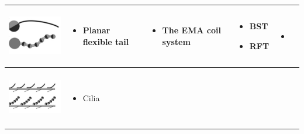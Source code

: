 \documentclass[12pt,a4paper,titlepage]{report}
\begin{document}
\begin{table}[h!]
\begin{tabular}{ c m{2.5cm}  m{4.3cm} m{3cm} m{2cm}}
\begin{minipage}{.3\textwidth}
      \includegraphics[width=\linewidth, height=25mm]{Planar_flexible_tail}
    \end{minipage}
    &
    \begin{minipage}[t]{3cm}
      \begin{itemize}
        \item Planar flexible tail
     
      \end{itemize}
    \end{minipage}
    & 
    \begin{minipage}[t]{4cm}
      \begin{itemize}
        \item The EMA coil system
     
      \end{itemize}
    \end{minipage}
 &
  \begin{minipage}[t]{3cm}
      \begin{itemize}
        \item BST
	\item RFT
     
      \end{itemize}
    \end{minipage}

	&
	   \begin{itemize}
        \item \citep{kim2013fabrication}
   
      \end{itemize}
    \\ \hline


\begin{minipage}{.3\textwidth}
      \includegraphics[width=\linewidth, height=25mm]{cilia-shape}
    \end{minipage}
    &
    \begin{minipage}[t]{3cm}
      \begin{itemize}
        \item Cilia
     

\end{itemize}
\end{minipage}
\end{tabular}
\end{table}
\end{document}
